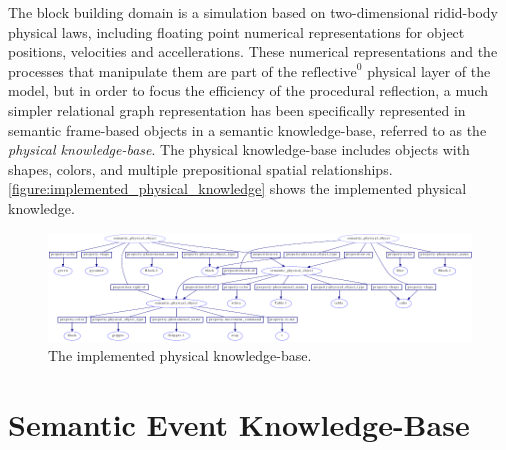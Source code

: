 The block building domain is a simulation based on two-dimensional
ridid-body physical laws, including floating point numerical
representations for object positions, velocities and accellerations.
These numerical representations and the processes that manipulate them
are part of the $\text{reflective}^0$ physical layer of the model, but
in order to focus the efficiency of the procedural reflection, a much
simpler relational graph representation has been specifically
represented in semantic frame-based objects in a semantic
knowledge-base, referred to as the \emph{physical knowledge-base}.
The physical knowledge-base includes objects with shapes, colors, and
multiple prepositional spatial relationships.
{\mbox{\autoref{figure:implemented_physical_knowledge}}} shows the
implemented physical knowledge.
\begin{figure}
\begin{center}
\includegraphics[width=24cm]{gfx/implemented_physical_knowledge}
\end{center}
\hspace{4cm}\parbox{15cm}{\caption[The implemented physical
    knowledge-base.]{The implemented physical
    knowledge-base.}\label{figure:implemented_physical_knowledge}}
\end{figure}

\section{Semantic Event Knowledge-Base}


